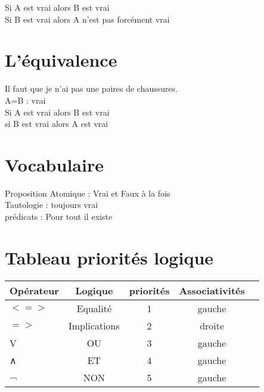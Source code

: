 Si A est vrai alors B est vrai \\

Si B est vrai alors A n'est pas forcément vrai \\

\newpage
\section{L'équivalence}
\vspace{5mm} %

Il faut que je n'ai pas une paires de chaussures. \\

A=B : vrai \\

Si A est vrai alors B est vrai \\

si B est vrai alors A est vrai \\

\section{Vocabulaire}
\vspace{5mm} %

Proposition Atomique : Vrai et Faux à la fois \\

Tautologie : toujours vrai \\

prédicats :  Pour tout il existe \\

\vspace{5mm}

\section{Tableau priorités logique}
\begin{tabular}{|l|c|c|c|c|}
  \hline
  Opérateur & Logique & priorités & Associativités \\
  \hline
  $<=>$ & Equalité & 1 & gauche \\
  $=>$ & Implications & 2 & droite \\
  V & OU & 3 & gauche \\
  ∧ & ET & 4 & gauche \\
  ¬ & NON & 5 & gauche \\
  \hline
\end{tabular}

\vspace{6mm}

